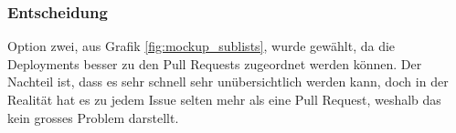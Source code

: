 \subsubsection{Entscheidung}
Option zwei, aus Grafik \ref{fig:mockup_sublists}, wurde gewählt, da die Deployments besser zu den Pull Requests
zugeordnet werden können. Der Nachteil ist, dass es sehr schnell sehr unübersichtlich werden kann, doch in der Realität
hat es zu jedem Issue selten mehr als eine Pull Request, weshalb das kein grosses Problem darstellt.
